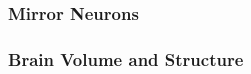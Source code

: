 \documentclass[man]{apa}
\begin{document}


\subsubsection{Mirror Neurons}

\subsubsection{Brain Volume and Structure}
\end{document}
